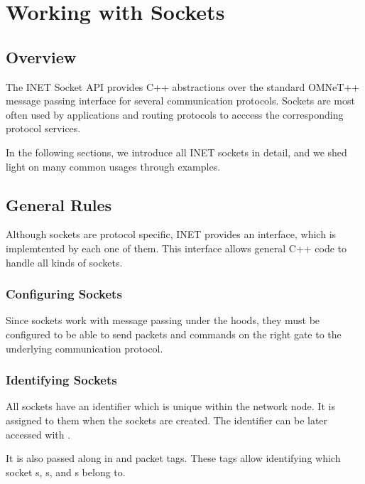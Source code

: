 \chapter{Working with Sockets}
\label{cha:sockets}

\section{Overview}

The INET Socket API provides C++ abstractions over the standard OMNeT++ message
passing interface for several communication protocols. Sockets are most often
used by applications and routing protocols to acccess the corresponding protocol
services.

In the following sections, we introduce all INET sockets in detail, and we shed
light on many common usages through examples.

\section{General Rules}

Although sockets are protocol specific, INET provides an 
interface, which is implemtented by each one of them. This interface allows
general C++ code to handle all kinds of sockets.

\subsection*{Configuring Sockets}

Since sockets work with message passing under the hoods, they must be configured
to be able to send packets and commands on the right gate to the underlying
communication protocol.


\subsection*{Identifying Sockets}

All sockets have an identifier which is unique within the network node. It is
assigned to them when the sockets are created. The identifier can be later
accessed with .

It is also passed along in  and  packet
tags. These tags allow identifying which socket s,
s, and s belong to.

